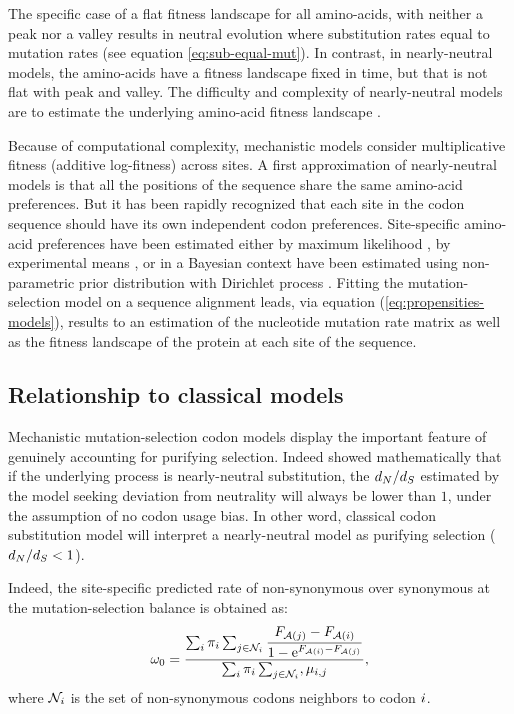 The specific case of a flat fitness landscape for all amino-acids, with neither a peak nor a valley results in neutral evolution where substitution rates equal to mutation rates (see equation \ref{eq:sub-equal-mut}).
In contrast, in \gls{nearly-neutral} models, the amino-acids have a fitness landscape fixed in time, but that is not flat with peak and valley.
The difficulty and complexity of \gls{nearly-neutral} models are to estimate the underlying amino-acid fitness landscape \citep{Halpern1998}.

Because of computational complexity, mechanistic models consider multiplicative fitness (additive log-fitness) across sites.
A first approximation of nearly-neutral models is that all the positions of the sequence share the same amino-acid preferences.
But it has been rapidly recognized that each site in the codon sequence should have its own independent codon preferences.
Site-specific amino-acid preferences have been estimated either by maximum likelihood \citep{Tamuri2012,Tamuri2014}, by experimental means \citep{Bloom2017}, or in a Bayesian context have been estimated using non-parametric
prior distribution with Dirichlet process \citep{Rodrigue2010, Rodrigue2014}.
Fitting the mutation-selection model on a sequence alignment leads, via equation (\ref{eq:propensities-models}), results to an estimation of the nucleotide mutation rate matrix as well as the fitness landscape of the protein at each site of the sequence.

\subsection{Relationship to classical models}
Mechanistic mutation-selection codon models display the important feature of genuinely accounting for purifying selection.
Indeed \citet{Spielman2015} showed mathematically that if the underlying process is nearly-neutral substitution, the $d_N / d_S$ estimated by the model seeking deviation from neutrality will always be lower than $1$, under the assumption of no codon usage bias.
In other word, classical codon substitution model will interpret a nearly-neutral model as purifying selection ($d_N / d_S < 1$).

Indeed, the site-specific predicted rate of non-synonymous over \gls{synonymous} at the mutation-selection balance is obtained as: 
\begin{equation}
\omega_0 = \dfrac{ \sum_{i} \pi_{i} \sum_{j \in \mathcal{N}_{{i}}} \dfrac{F_{\mathcal{A}({j})} - F_{\mathcal{A}({i})}}{1 - \mathrm{e}^{F_{\mathcal{A}({i})} - F_{\mathcal{A}({j})}} }}{\sum_{i} \pi_{i} \sum_{j \in \mathcal{N}_{{i}} }, \mu_{{i}, {j}}},
\end{equation}
where $\mathcal{N}_{{i}}$ is the set of non-synonymous codons neighbors to codon ${i}$.

